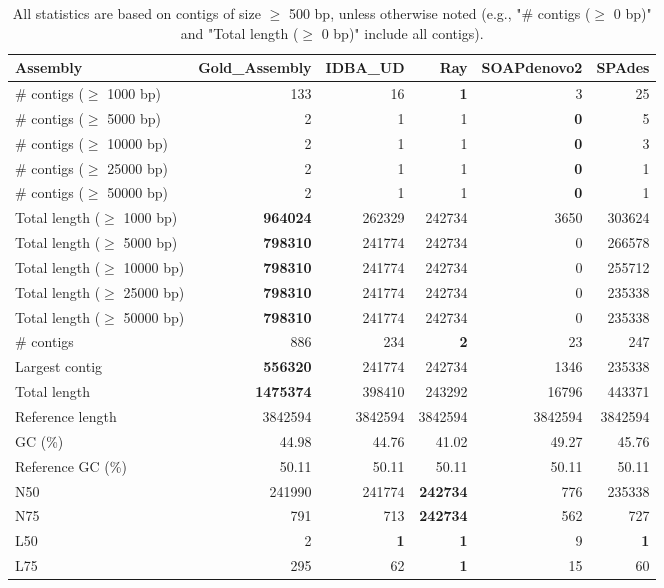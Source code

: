 \documentclass[12pt,a4paper]{article}
\begin{document}
\begin{table}[ht]
\begin{center}
\caption{All statistics are based on contigs of size $\geq$ 500 bp, unless otherwise noted (e.g., "\# contigs ($\geq$ 0 bp)" and "Total length ($\geq$ 0 bp)" include all contigs).}
\begin{tabular}{|l*{5}{|r}|}
\hline
Assembly & Gold\_Assembly & IDBA\_UD & Ray & SOAPdenovo2 & SPAdes \\ \hline
\# contigs ($\geq$ 1000 bp) & 133 & 16 & {\bf 1} & 3 & 25 \\ \hline
\# contigs ($\geq$ 5000 bp) & 2 & 1 & 1 & {\bf 0} & 5 \\ \hline
\# contigs ($\geq$ 10000 bp) & 2 & 1 & 1 & {\bf 0} & 3 \\ \hline
\# contigs ($\geq$ 25000 bp) & 2 & 1 & 1 & {\bf 0} & 1 \\ \hline
\# contigs ($\geq$ 50000 bp) & 2 & 1 & 1 & {\bf 0} & 1 \\ \hline
Total length ($\geq$ 1000 bp) & {\bf 964024} & 262329 & 242734 & 3650 & 303624 \\ \hline
Total length ($\geq$ 5000 bp) & {\bf 798310} & 241774 & 242734 & 0 & 266578 \\ \hline
Total length ($\geq$ 10000 bp) & {\bf 798310} & 241774 & 242734 & 0 & 255712 \\ \hline
Total length ($\geq$ 25000 bp) & {\bf 798310} & 241774 & 242734 & 0 & 235338 \\ \hline
Total length ($\geq$ 50000 bp) & {\bf 798310} & 241774 & 242734 & 0 & 235338 \\ \hline
\# contigs & 886 & 234 & {\bf 2} & 23 & 247 \\ \hline
Largest contig & {\bf 556320} & 241774 & 242734 & 1346 & 235338 \\ \hline
Total length & {\bf 1475374} & 398410 & 243292 & 16796 & 443371 \\ \hline
Reference length & 3842594 & 3842594 & 3842594 & 3842594 & 3842594 \\ \hline
GC (\%) & 44.98 & 44.76 & 41.02 & 49.27 & 45.76 \\ \hline
Reference GC (\%) & 50.11 & 50.11 & 50.11 & 50.11 & 50.11 \\ \hline
N50 & 241990 & 241774 & {\bf 242734} & 776 & 235338 \\ \hline
N75 & 791 & 713 & {\bf 242734} & 562 & 727 \\ \hline
L50 & 2 & {\bf 1} & {\bf 1} & 9 & {\bf 1} \\ \hline
L75 & 295 & 62 & {\bf 1} & 15 & 60 \\ \hline

\end{tabular}
\end{center}
\end{table}
\end{document}
